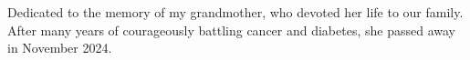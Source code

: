 Dedicated to the memory of my grandmother, who devoted her life to our family. After many years of courageously battling cancer and diabetes, she passed away in November 2024.